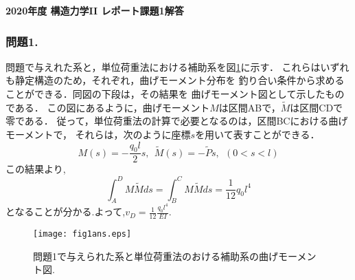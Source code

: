 \documentclass[10pt,a4j]{jarticle}
\newlength{\minitwocolumn}
\begin{document}
\def\Mmaru#1{{\ooalign{\hfil#1\/\hfil\crcr
\raise.167ex\hbox{\mathhexbox 20D}}}}


\newcommand{\fat}[1]{\mbox{\boldmath $#1$}}
\newcommand{\D}{\partial}

\newcommand{\w}{\omega}
\newcommand{\ga}{\alpha}
\newcommand{\gb}{\beta}
\newcommand{\gx}{\xi}
\newcommand{\gz}{\zeta}
\newcommand{\vhat}[1]{\hat{\fat{#1}}}
\newcommand{\spc}{\vspace{0.7\baselineskip}}
\newcommand{\halfspc}{\vspace{0.3\baselineskip}}

\newcommand{\twofig}[2]
 {
   \begin{figure}[h]
     \begin{minipage}[t]{\minitwocolumn}
         \begin{center}   #1
         \end{center}
     \end{minipage}
         \hspace{\columnsep}
     \begin{minipage}[t]{\minitwocolumn}
         \begin{center} #2
         \end{center}
     \end{minipage}
   \end{figure}
 }
\begin{center}
{\Large \bf 2020年度 構造力学II レポート課題1解答} \\
\end{center}
\subsubsection*{問題1.}
問題で与えれた系と，単位荷重法における補助系を図\ref{fig:fig1}に示す．
これらはいずれも静定構造のため，それぞれ，曲げモーメント分布を
釣り合い条件から求めることができる．同図の下段は，その結果を
曲げモーメント図として示したものである．
この図にあるように，曲げモーメント$M$は区間ABで，$\tilde M$は区間CDで零である．
従って，単位荷重法の計算で必要となるのは，区間BCにおける曲げモーメントで，
それらは，次のように座標$s$を用いて表すことができる．
\begin{equation}
	M(s)=-\frac{q_0l}{2}s, \ \ \tilde M(s)=-\tilde P s, \ \ (0<s<l)
\end{equation}
この結果より,
\begin{equation}
	\int_A^D M\tilde Mds= \int_B^CM \tilde Mds=\frac{1}{12}q_0l^4
\end{equation}
となることが分かる.よって,$v_D=\frac{1}{12}\frac{q_0l^4}{EI}$.
\begin{figure}[h]
	\begin{center}
	\texttt{[image: fig1ans.eps]} 
	\end{center}
	\caption{問題1で与えられた系と単位荷重法のおける補助系の曲げモーメント図. } 
	\label{fig:fig1}
\end{figure}
\end{document}
